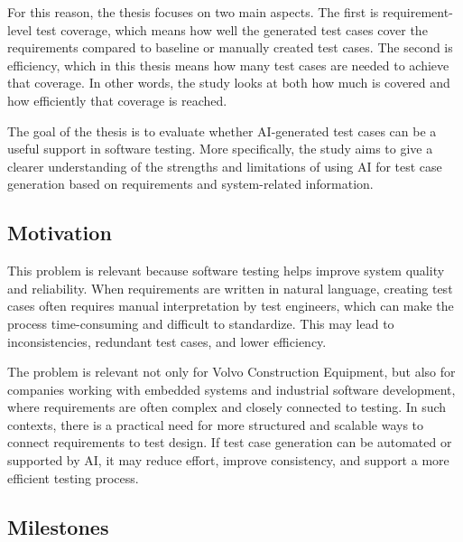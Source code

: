 \documentclass[a4paper,12pt]{article}
\begin{document}
For this reason, the thesis focuses on two main aspects. The first is requirement-level test coverage, which means how well the generated test cases cover the requirements compared to baseline or manually created test cases. The second is efficiency, which in this thesis means how many test cases are needed to achieve that coverage. In other words, the study looks at both how much is covered and how efficiently that coverage is reached.

The goal of the thesis is to evaluate whether AI-generated test cases can be a useful support in software testing. More specifically, the study aims to give a clearer understanding of the strengths and limitations of using AI for test case generation based on requirements and system-related information.

\subsection{Motivation}
This problem is relevant because software testing helps improve system quality and reliability. When requirements are written in natural language, creating test cases often requires manual interpretation by test engineers, which can make the process time-consuming and difficult to standardize. This may lead to inconsistencies, redundant test cases, and lower efficiency.

The problem is relevant not only for Volvo Construction Equipment, but also for companies working with embedded systems and industrial software development, where requirements are often complex and closely connected to testing. In such contexts, there is a practical need for more structured and scalable ways to connect requirements to test design. If test case generation can be automated or supported by AI, it may reduce effort, improve consistency, and support a more efficient testing process.


\subsection{Milestones}
\end{document}
